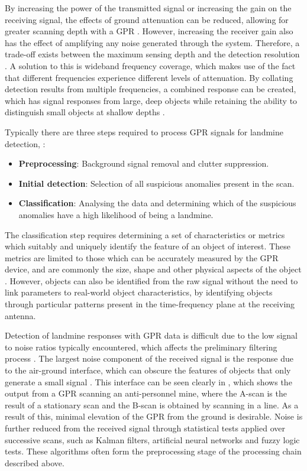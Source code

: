 \documentclass[main.tex]{subfiles}
\begin{document}
By increasing the power of the transmitted signal or increasing the gain on the receiving signal, the effects of ground attenuation can be reduced, allowing for greater scanning depth with a GPR \parencite{Ho2008}. However, increasing the receiver gain also has the effect of amplifying any noise generated through the system. Therefore, a trade-off exists between the maximum sensing depth and the detection resolution  \parencite{shresta2003}. A solution to this is wideband frequency coverage, which makes use of the fact that different frequencies experience different levels of attenuation. By collating detection results from multiple frequencies, a combined response can be created, which has signal responses from large, deep objects while retaining the ability to distinguish small objects at shallow depths \parencite{3dradarDXG}.

Typically there are three steps required to process GPR signals for landmine detection, \parencite{Ho.etal2004}:
\begin{itemize}
\item \textbf{Preprocessing}: Background signal removal and clutter suppression.
\item \textbf{Initial detection}: Selection of all suspicious anomalies present in the scan.
\item \textbf{Classification}: Analysing the data and determining which of the suspicious anomalies have a high likelihood of being a landmine.
\end{itemize}
The classification step requires determining a set of characteristics or metrics which suitably and uniquely identify the feature of an object of interest. These metrics are limited to those which can be accurately measured by the GPR device, and are commonly the size, shape and other physical aspects of the object \parencite{Ho2008}. However, objects can also be identified from the raw signal without the need to link parameters to real-world object characteristics, by identifying objects through particular patterns present in the time-frequency plane at the receiving antenna. 

Detection of landmine responses with GPR data is difficult due to the low signal to noise ratios typically encountered, which affects the preliminary filtering process \parencite{shresta2003}. The largest noise component of the received signal is the response due to the air-ground interface, which can obscure the features of objects that only generate a small signal \parencite{Yarovoy2009}. This interface can be seen clearly in , which shows the output from a GPR scanning an anti-personnel mine, where the A-scan is the result of a stationary scan and the B-scan is obtained by scanning in a line. As a result of this, minimal elevation of the GPR from the ground is desirable. Noise is further reduced from the received signal through statistical tests applied over successive scans, such as Kalman filters, artificial neural networks and fuzzy logic tests. These algorithms often form the preprocessing stage of the processing chain described above.
\end{document}
